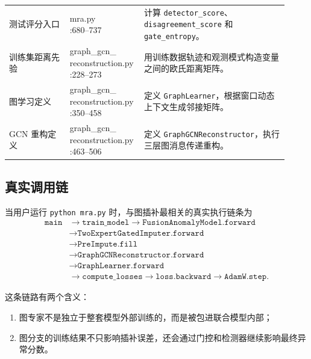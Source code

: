 \documentclass[UTF8]{ctexart}
\newcommand{\codecell}[1]{\parbox[t]{\linewidth}{\raggedright\ttfamily\small #1}}
\begin{document}
{\begin{longtable}{@{}>{\raggedright\arraybackslash}p{0.21\linewidth} >{\raggedright\arraybackslash}p{0.21\linewidth} >{\raggedright\arraybackslash}p{0.50\linewidth}@{}}
测试评分入口 & \codecell{mra.py\\:680--737} & 计算 \texttt{detector\_score}、\texttt{disagreement\_score} 和 \texttt{gate\_entropy}。 \\
训练集距离先验 & \codecell{graph\_gcn\_\\reconstruction.py\\:228--273} & 用训练数据轨迹和观测模式构造变量之间的欧氏距离矩阵。 \\
图学习定义 & \codecell{graph\_gcn\_\\reconstruction.py\\:350--458} & 定义 \texttt{GraphLearner}，根据窗口动态上下文生成邻接矩阵。 \\
GCN 重构定义 & \codecell{graph\_gcn\_\\reconstruction.py\\:463--506} & 定义 \texttt{GraphGCNReconstructor}，执行三层图消息传递重构。 \\
\bottomrule
\end{longtable}
}

\subsection{真实调用链}

当用户运行 \texttt{python mra.py} 时，与图插补最相关的真实执行链条为
\begin{equation}
    \begin{aligned}
        \texttt{main}
        &\rightarrow \texttt{train\_model}
        \rightarrow \texttt{FusionAnomalyModel.forward} \\
        &\rightarrow \texttt{TwoExpertGatedImputer.forward} \\
        &\rightarrow \texttt{PreImpute.fill} \\
        &\rightarrow \texttt{GraphGCNReconstructor.forward} \\
        &\rightarrow \texttt{GraphLearner.forward} \\
        &\rightarrow \texttt{compute\_losses}
        \rightarrow \texttt{loss.backward}
        \rightarrow \texttt{AdamW.step}.
    \end{aligned}
\end{equation}

这条链路有两个含义：
\begin{enumerate}
    \item 图专家不是独立于整套模型外部训练的，而是被包进联合模型内部；
    \item 图分支的训练结果不只影响插补误差，还会通过门控和检测器继续影响最终异常分数。
\end{enumerate}
\end{document}
